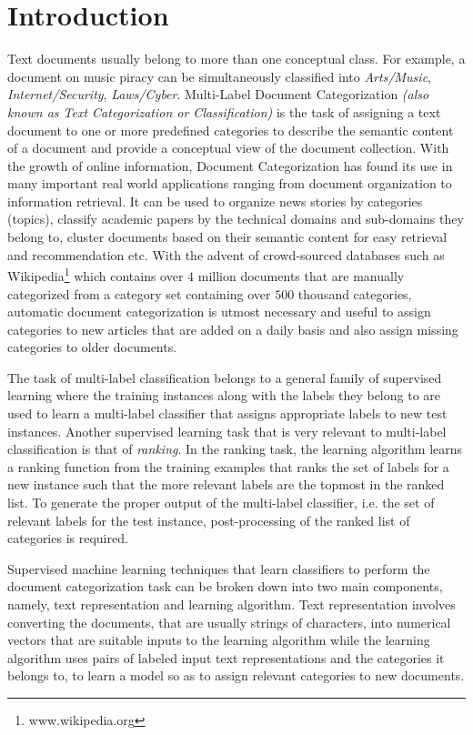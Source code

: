 \chapter{Introduction}
\label{chapter:introduction}

Text documents usually belong to more than one conceptual class. For example, a document on music piracy can be simultaneously classified into \emph{Arts/Music}, \emph{Internet/Security}, \emph{Laws/Cyber}.     Multi-Label Document Categorization \emph{(also known as Text Categorization or Classification)} is the task of assigning a text document to one or more predefined categories to describe the semantic content of a document and provide a conceptual view of the document collection.
With the growth of online information, Document Categorization has found its use in many important real world applications ranging from document organization to information retrieval. It can be used to organize news stories by categories (topics), classify academic papers by the technical domains and sub-domains they belong to, cluster documents based on their semantic content for easy retrieval and recommendation etc.
With the advent of crowd-sourced databases such as Wikipedia\footnote{www.wikipedia.org} which contains over $4$ million documents that are manually categorized from a category set containing over $500$ thousand categories, automatic document categorization is utmost necessary and useful to assign categories to new articles that are added on a daily basis and also assign missing categories to older documents.

The task of multi-label classification belongs to a general family of supervised learning where the training instances along with the labels they belong to are used to learn a multi-label classifier that assigns appropriate labels to new test instances. 
Another supervised learning task that is very relevant to multi-label classification is that of \emph{ranking}. In the ranking task, the learning algorithm learns a ranking function from the training examples that ranks the set of labels for a new instance such that the more relevant labels are the topmost in the ranked list. 
To generate the proper output of the multi-label classifier, i.e. the set of relevant labels for the test instance, post-processing of the ranked list of categories is required.

Supervised machine learning techniques that learn classifiers to perform the document categorization task can be broken down into two main components, namely, text representation and learning algorithm. 
Text representation involves converting the documents, that are usually strings of characters, into numerical vectors that are suitable inputs to the learning algorithm while the learning algorithm uses pairs of labeled input text representations and the categories it belongs to, to learn a model so as to assign relevant categories to new documents. 

